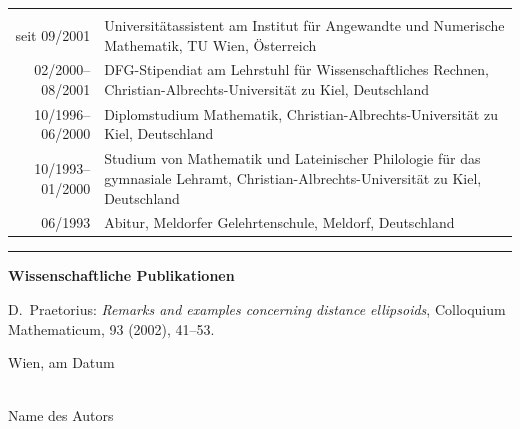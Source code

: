 \documentclass[a4paper,11pt,bibliography=totoc,listof=totoc,headinclude=true,cleardoublepage=empty,oneside]{NumPDEsThesis}
\begin{document}
\begin{tabular}{rp{}}
\hspace*{.2\textwidth}&\\
seit 09/2001 & Universitätassistent am Institut für Angewandte und Numerische Mathematik, TU Wien, Österreich \\
02/2000--08/2001 & DFG-Stipendiat am Lehrstuhl für Wissenschaftliches Rechnen, Christian-Albrechts-Universität zu Kiel, Deutschland \\ 
10/1996--06/2000 & Diplomstudium Mathematik, Christian-Albrechts-Universität zu Kiel, Deutschland \\
10/1993--01/2000 & Studium von Mathematik und Lateinischer Philologie für das gymnasiale Lehramt, Christian-Albrechts-Universität zu Kiel, Deutschland \\
06/1993 & Abitur, Meldorfer Gelehrtenschule, Meldorf, Deutschland \\
\end{tabular}

\bigskip
\bigskip
\hrule
\bigskip
\bigskip

\noindent
{\bfseries\Large Wissenschaftliche Publikationen}

\bigskip

\noindent
D.~Praetorius: \emph{Remarks and examples concerning distance ellipsoids}, Colloquium Mathematicum, 93 (2002), 41--53.

\vspace*{3cm}

\noindent
Wien, am {\color{change}Datum} %
%
\hfill 
%
\begin{minipage}[t]{5cm}
\centering
\underline{\hspace*{5cm}}\\
\small\color{change}Name des Autors
\end{minipage}
\end{document}
